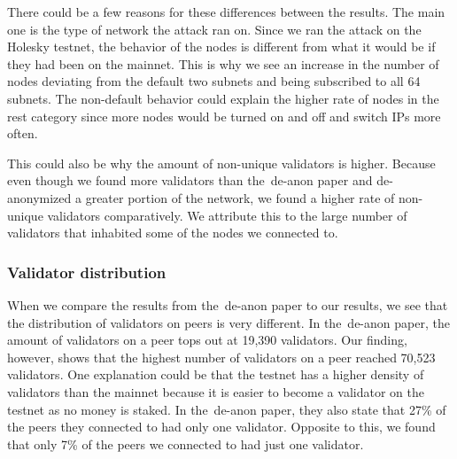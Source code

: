 There could be a few reasons for these differences between the results.
The main one is the type of network the attack ran on.
Since we ran the attack on the Holesky testnet, the behavior of the nodes is different from what it would be if they had been on the mainnet.
This is why we see an increase in the number of nodes deviating from the default two subnets and being subscribed to all 64 subnets.
The non-default behavior could explain the higher rate of nodes in the rest category since more nodes would be turned on and off and switch IPs more often.


This could also be why the amount of non-unique validators is higher.
Because even though we found more validators than the~\gls{de-anon paper} and de-anonymized a greater portion of the network, we found a higher rate of non-unique validators comparatively.
We attribute this to the large number of validators that inhabited some of the nodes we connected to.



\subsubsection{Validator distribution}\label{subsubsec:validator-distribution}
When we compare the results from the~\gls{de-anon paper} to our results, we see that the distribution of validators on peers is very different.
In the~\gls{de-anon paper}, the amount of validators on a peer tops out at 19,390 validators.
Our finding, however, shows that the highest number of validators on a peer reached 70,523 validators.
One explanation could be that the testnet has a higher density of validators than the mainnet because it is easier to become a validator on the testnet as no money is staked.
In the~\gls{de-anon paper}, they also state that 27\% of the peers they connected to had only one validator.
Opposite to this, we found that only 7\% of the peers we connected to had just one validator.
